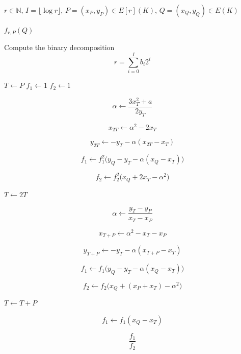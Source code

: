 \documentclass[12pt,a4paper]{report}
\begin{document}
	\begin{algorithm}
	\caption{Miller's Algorithm for Affine Short Weierstrass Coordinates}
	\begin{algorithmic}[1]

	\Require 
	$r \in \mathbb{N}$,
	$I=\lfloor \log r \rfloor$,
	$P=(x_P,y_P)\in E[r](K)$,
	$Q=(x_Q,y_Q)\in E(K)$

	\Ensure 
	$f_{r,P}(Q)$

	\State Compute the binary decomposition
	\[
	r=\sum_{i=0}^{I} b_i 2^i
	\]

	\State $T \gets P$
	\State $f_1 \gets 1$
	\State $f_2 \gets 1$


	    \State
	    \[
	    \alpha \gets \frac{3x_T^2+a}{2y_T}
	    \]

	    \State
	    \[
	    x_{2T} \gets \alpha^2 - 2x_T
	    \]

	    \State
	    \[
	    y_{2T} \gets -y_T - \alpha(x_{2T}-x_T)
	    \]

	    \State
	    \[
	    f_1 \gets f_1^2
	    \bigl(
	    y_Q-y_T-\alpha(x_Q-x_T)
	    \bigr)
	    \]

	    \State
	    \[
	    f_2 \gets f_2^2
	    \bigl(
	    x_Q+2x_T-\alpha^2
	    \bigr)
	    \]

	    \State $T \gets 2T$


	        \State
	        \[
	        \alpha \gets
	        \frac{y_T-y_P}{x_T-x_P}
	        \]

	        \State
	        \[
	        x_{T+P} \gets \alpha^2-x_T-x_P
	        \]

	        \State
	        \[
	        y_{T+P} \gets -y_T-\alpha(x_{T+P}-x_T)
	        \]

	        \State
	        \[
	        f_1 \gets
	        f_1
	        \bigl(
	        y_Q-y_T-\alpha(x_Q-x_T)
	        \bigr)
	        \]

	        \State
	        \[
	        f_2 \gets
	        f_2
	        \bigl(
	        x_Q+(x_P+x_T)-\alpha^2
	        \bigr)
	        \]

	        \State $T \gets T+P$

	    \EndIf

	\EndFor

	\State
	\[
	f_1 \gets f_1(x_Q-x_T)
	\]

	\State \Return
	\[
	\frac{f_1}{f_2}
	\]

	\end{algorithmic}
	\end{algorithm}
\newpage
\end{document}
